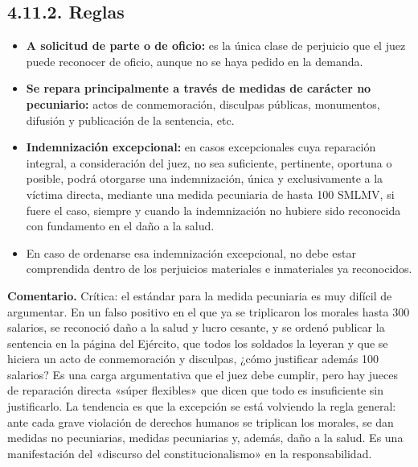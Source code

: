 \subsection{4.11.2. Reglas}
\begin{itemize}
\item \textbf{A solicitud de parte o de oficio:} es la única clase de perjuicio que el juez puede reconocer de oficio, aunque no se haya pedido en la demanda.
\item \textbf{Se repara principalmente a través de medidas de carácter no pecuniario:} actos de conmemoración, disculpas públicas, monumentos, difusión y publicación de la sentencia, etc.
\item \textbf{Indemnización excepcional:} en casos excepcionales cuya reparación integral, a consideración del juez, no sea suficiente, pertinente, oportuna o posible, podrá otorgarse una indemnización, única y exclusivamente a la víctima directa, mediante una medida pecuniaria de hasta 100 SMLMV, si fuere el caso, siempre y cuando la indemnización no hubiere sido reconocida con fundamento en el daño a la salud.
\item En caso de ordenarse esa indemnización excepcional, no debe estar comprendida dentro de los perjuicios materiales e inmateriales ya reconocidos.
\end{itemize}
\begin{comentario}
\textcolor[HTML]{8A6D3B}{\textbf{Comentario. }}Crítica: el estándar para la medida pecuniaria es muy difícil de argumentar. En un falso positivo en el que ya se triplicaron los morales hasta 300 salarios, se reconoció daño a la salud y lucro cesante, y se ordenó publicar la sentencia en la página del Ejército, que todos los soldados la leyeran y que se hiciera un acto de conmemoración y disculpas, ¿cómo justificar además 100 salarios? Es una carga argumentativa que el juez debe cumplir, pero hay jueces de reparación directa «súper flexibles» que dicen que todo es insuficiente sin justificarlo. La tendencia es que la excepción se está volviendo la regla general: ante cada grave violación de derechos humanos se triplican los morales, se dan medidas no pecuniarias, medidas pecuniarias y, además, daño a la salud. Es una manifestación del «discurso del constitucionalismo» en la responsabilidad.
\end{comentario}
